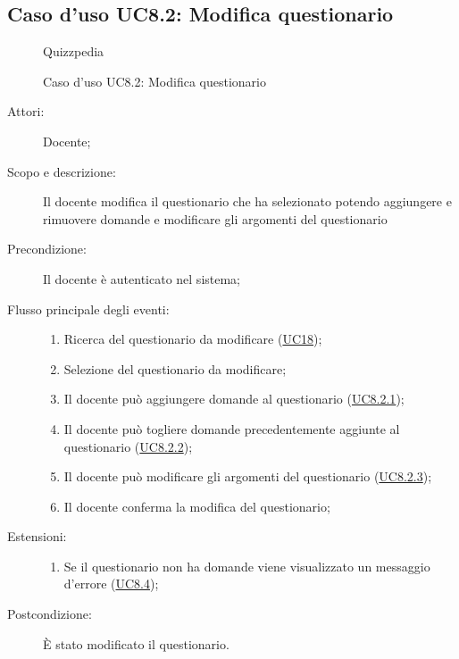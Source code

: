 \subsection{Caso d'uso UC8.2: Modifica questionario}
        \begin{figure}[H]
            \centering
            \begin{resizedtikzpicture}{\textwidth}
		\begin{umlsystem}[x=0, fill=lightgray!20]{Quizzpedia}
		\end{umlsystem}
            \end{resizedtikzpicture}
            \caption{Caso d'uso UC8.2: Modifica questionario}
            \label{fig:UC8.2} 
        \end{figure}
    \begin{description}
\item[Attori:] Docente;
\item[Scopo e descrizione:] Il docente modifica il questionario che ha selezionato potendo aggiungere e rimuovere domande e modificare gli argomenti del questionario
      \item[Precondizione:] Il docente è autenticato nel sistema;

        \item[Flusso principale degli eventi:] \begin{enumerate}
          \item Ricerca del questionario da modificare (\hyperlink{UC18}{UC18});
          \item Selezione del questionario da modificare;
          \item Il docente può aggiungere domande al questionario (\hyperlink{UC8.2.1}{UC8.2.1});
          \item Il docente può togliere domande precedentemente aggiunte al questionario (\hyperlink{UC8.2.2}{UC8.2.2});
          \item Il docente può modificare gli argomenti del questionario (\hyperlink{UC8.2.3}{UC8.2.3});
          \item Il docente conferma la modifica del questionario;

      \end{enumerate}
    \item[Estensioni:]
      \begin{enumerate}
          \item Se il questionario non ha domande viene visualizzato un messaggio d'errore (\hyperlink{UC8.4}{UC8.4});

      \end{enumerate}
    \item[Postcondizione:] È stato modificato il questionario.
  \end{description}
\hypertarget{UC8.2.1}{}
